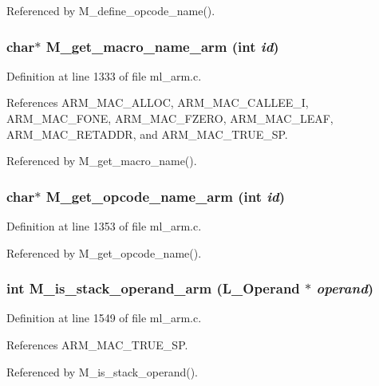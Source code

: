 Referenced by M\_\-define\_\-opcode\_\-name().
\subsubsection{\setlength{\rightskip}{0pt plus 5cm}char$\ast$ M\_\-get\_\-macro\_\-name\_\-arm (int {\em id})}\label{ml__arm_8c_1ccd24554d6d2b03ca45a0859999f4b8}




Definition at line 1333 of file ml\_\-arm.c.

References ARM\_\-MAC\_\-ALLOC, ARM\_\-MAC\_\-CALLEE\_\-I, ARM\_\-MAC\_\-FONE, ARM\_\-MAC\_\-FZERO, ARM\_\-MAC\_\-LEAF, ARM\_\-MAC\_\-RETADDR, and ARM\_\-MAC\_\-TRUE\_\-SP.

Referenced by M\_\-get\_\-macro\_\-name().
\subsubsection{\setlength{\rightskip}{0pt plus 5cm}char$\ast$ M\_\-get\_\-opcode\_\-name\_\-arm (int {\em id})}\label{ml__arm_8c_1e4a4dc60acbb2a8c03f10f0f7ed72fd}




Definition at line 1353 of file ml\_\-arm.c.

Referenced by M\_\-get\_\-opcode\_\-name().
\subsubsection{\setlength{\rightskip}{0pt plus 5cm}int M\_\-is\_\-stack\_\-operand\_\-arm (L\_\-Operand $\ast$ {\em operand})}\label{ml__arm_8c_904277c499831273a69c6082decbf484}




Definition at line 1549 of file ml\_\-arm.c.

References ARM\_\-MAC\_\-TRUE\_\-SP.

Referenced by M\_\-is\_\-stack\_\-operand().

